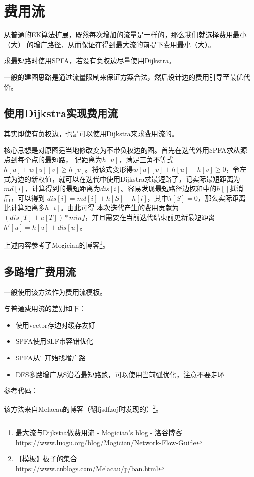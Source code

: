 \section{费用流}
从普通的EK算法扩展，既然每次增加的流量是一样的，那么我们就选择费用最小（大）
的增广路径，从而保证在得到最大流的前提下费用最小（大）。

求最短路时使用SPFA，若没有负权边尽量使用Dijkstra。

一般的建图思路是通过流量限制来保证方案合法，然后设计边的费用引导至最优代价。

\subsection{使用Dijkstra实现费用流}\label{DijMCMF}
其实即使有负权边，也是可以使用Dijkstra来求费用流的。

核心思想是对原图适当地修改变为不带负权边的图。首先在迭代外用SPFA求从源点到每个点的最短路，
记距离为$h[u]$，满足三角不等式$h[u]+w[u][v]\geq h[v]$。将该式变形得$w[u][v]+h[u]-h[v]
\geq 0$，令左式为边的新权值，就可以在迭代中使用Dijkstra求最短路了，记实际最短距离为
$md[i]$，计算得到的最短距离为$dis[i]$。容易发现最短路径边权和中的$h[]$抵消后，可以得到
$dis[i]=md[i]+h[S]-h[i]$，其中$h[S]=0$，那么实际距离比计算距离多$h[i]$。由此可得
本次迭代产生的费用贡献为$(dis[T]+h[T])*minf$，并且需要在当前迭代结束前更新最短距离
$h'[u]=h[u]+dis[u]$。

上述内容参考了Mogician的博客\footnote{
    最大流与Dijkstra做费用流 - Mogician's blog - 洛谷博客
    \url{https://www.luogu.org/blog/Mogician/Network-Flow-Guide}}。
\subsection{多路增广费用流}
一般使用该方法作为费用流模板。

与普通费用流的差别如下：
\begin{itemize}
    \item 使用vector存边对缓存友好
    \item SPFA使用SLF带容错优化
    \item SPFA从T开始找增广路
    \item DFS多路增广从S沿着最短路跑，可以使用当前弧优化，注意不要走环
\end{itemize}

参考代码：


该方法来自Melacau的博客（翻fjsdfzoj时发现的）\footnote{
    【模板】板子的集合\\
    \url{https://www.cnblogs.com/Melacau/p/ban.html}
}。
